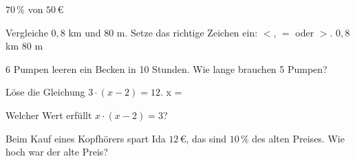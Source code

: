 \documentclass[11pt]{article}
\begin{document}
\noindent\begin{minipage}[t]{0.485\linewidth}\raggedright
\begin{aufgabe}{$70\,\%$ von $50\,€$ \leerfeld[€]}
\end{aufgabe}
\end{minipage}\hfill\begin{minipage}[t]{0.485\linewidth}\raggedright
\begin{aufgabe}{Vergleiche $0{,}8$ km und $80$ m. Setze das richtige Zeichen ein: $<$, $=$ oder $>$. $0{,}8$ km \leerfeld $80$ m}
\end{aufgabe}
\end{minipage}\par

\noindent\begin{minipage}[t]{0.485\linewidth}\raggedright
\begin{aufgabe}{6 Pumpen leeren ein Becken in 10 Stunden. Wie lange brauchen 5 Pumpen? \leerfeld[h]}
\end{aufgabe}
\end{minipage}\hfill\begin{minipage}[t]{0.485\linewidth}\raggedright
\begin{aufgabe}{Löse die Gleichung $3 \cdot (x - 2) = 12$. x = \leerfeld}
\end{aufgabe}
\end{minipage}\par

\begin{aufgabe}{Welcher Wert erfüllt $x \cdot (x - 2) = 3$? \\    }
\end{aufgabe}

\begin{aufgabe}{Beim Kauf eines Kopfhörers spart Ida $12\,€$, das sind $10\,\%$ des alten Preises. Wie hoch war der alte Preis? \leerfeld[€]}
\end{aufgabe}
\end{document}
